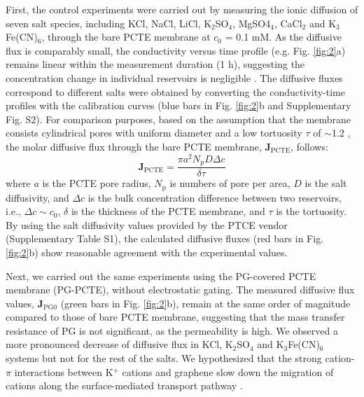 \documentclass[journal=langd5,email=true, hyperref=true, keywords=false]{achemso}
\newcommand{\Fig}{Fig.}
\begin{document}
First, the control experiments were carried out by measuring the ionic
diffusion of seven salt species, including KCl, NaCl, LiCl,
K$_{2}$SO$_{4}$, MgSO4$_{4}$, CaCl$_{2}$ and K$_{3}$Fe(CN)$_{6}$,
through the bare PCTE membrane at $c_{0}$ = 0.1 mM. As the diffusive
flux is comparably small, the conductivity versus time profile
(e.g. \Fig{} \ref{fig:2}a) remains linear within the measurement
duration (1 h), suggesting the concentration change in individual
reservoirs is negligible . The diffusive fluxes
correspond to different salts were obtained by converting the
conductivity-time profiles with the calibration curves (blue bars in
\Fig{} \ref{fig:2}b and Supplementary \Fig{} S2). For comparison
purposes, based on the assumption that the membrane consists
cylindrical pores with uniform diameter and a low tortuosity $\tau$ of
$\sim{}$1.2 \cite{O_Hern_2012}, the molar diffusive flux through the
bare PCTE membrane, $\boldsymbol{J}_{\mathrm{PCTE}}$, follows:
  \begin{equation}
    \label{eq:j-pcte}
    \boldsymbol{J}_{\mathrm{PCTE}} = \frac{\pi a^{2} N_{\mathrm{p}} D \Delta c}{\delta \tau}
  \end{equation}
where $a$ is the PCTE pore radius, $N_{\mathrm{p}}$ is numbers of pore
per area, $D$ is the salt diffusivity, and $\Delta c$ is the bulk
concentration difference between two reservoirs, i.e.,
$\Delta c \sim c_{0}$, $\delta$ is the thickness of the PCTE membrane,
and $\tau$ is the tortuosity. By using the salt diffusivity values
provided by the PTCE vendor (Supplementary Table S1), the
calculated diffusive fluxes (red bars in \Fig{} \ref{fig:2}b) show
reasonable agreement with the experimental values.

Next, we carried out the same experiments using the PG-covered PCTE
membrane (PG-PCTE), without electrostatic gating. The measured
diffusive flux values, $\boldsymbol{J}_{\mathrm{PG0}}$ (green bars in
\Fig{} \ref{fig:2}b), remain at the same order of magnitude compared
to those of bare PCTE membrane, suggesting that the mass transfer
resistance of PG is not significant, as the permeability is high. We
observed a more pronounced decrease of diffusive flux in KCl,
K$_{2}$SO$_{4}$ and K$_{3}$Fe(CN)$_{6}$ systems but not for the rest
of the salts. We hypothesized that the strong cation-$\pi$ interactions
between K$^{+}$ cations and graphene slow down the migration of cations
along the surface-mediated transport pathway \cite{Sun_2014}.
\end{document}
